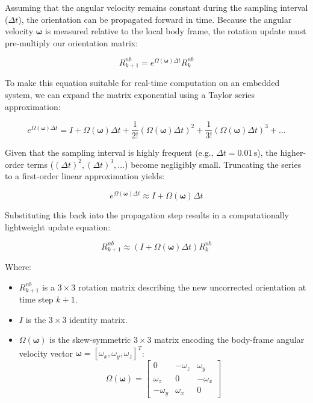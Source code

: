 \documentclass{article}
\begin{document}
\vspace{1em}
\noindent Assuming that the angular velocity remains constant during the sampling interval ($\Delta t$), the orientation can be propagated forward in time. Because the angular velocity $\boldsymbol{\omega}$ is measured relative to the local body frame, the rotation update must pre-multiply our orientation matrix:

\[
R_{k+1}^{nb} = e^{\Omega(\boldsymbol{\omega})\Delta t} R_{k}^{nb}
\]

\noindent To make this equation suitable for real-time computation on an embedded system, we can expand the matrix exponential using a Taylor series approximation:

\[
e^{\Omega(\boldsymbol{\omega})\Delta t} = I + \Omega(\boldsymbol{\omega})\Delta t + \frac{1}{2!}\left(\Omega(\boldsymbol{\omega})\Delta t\right)^2 + \frac{1}{3!}\left(\Omega(\boldsymbol{\omega})\Delta t\right)^3 + \dots
\]

\noindent Given that the sampling interval is highly frequent (e.g., $\Delta t = 0.01\,\mathrm{s}$), the higher-order terms ($(\Delta t)^2, (\Delta t)^3, \dots$) become negligibly small. Truncating the series to a first-order linear approximation yields:

\[
e^{\Omega(\boldsymbol{\omega})\Delta t} \approx I + \Omega(\boldsymbol{\omega})\Delta t
\]

\noindent Substituting this back into the propagation step results in a computationally lightweight update equation:

\[
R_{k+1}^{nb} \approx \left(I + \Omega(\boldsymbol{\omega})\Delta t\right) R_{k}^{nb}
\]

\noindent Where:
\begin{itemize}
	\item $R_{k+1}^{nb}$ is a $3\times3$ rotation matrix describing the new uncorrected orientation at time step $k+1$.
	\item $I$ is the $3\times3$ identity matrix.
	\item $\Omega(\boldsymbol{\omega})$ is the skew-symmetric $3\times3$ matrix encoding the body-frame angular velocity vector $\boldsymbol{\omega} = [\omega_x, \omega_y, \omega_z]^T$:
	\[
	\Omega(\boldsymbol{\omega}) = \begin{bmatrix}
		0 & -\omega_z & \omega_y \\
		\omega_z & 0 & -\omega_x \\
		-\omega_y & \omega_x & 0
	\end{bmatrix}
	\]
\end{itemize}
\end{document}
